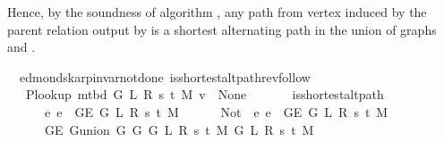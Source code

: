 \begin{isabellebody}
\isamarkupfalse%
%
\endisatagproof
{\isafoldproof}%
%
\isadelimproof
%
\endisadelimproof
%
\begin{isamarkuptext}%
Hence, by the soundness of algorithm , any path from vertex  induced
by the parent relation output by  is a shortest alternating path in the union
of graphs  and .%
\end{isamarkuptext}\isamarkuptrue%
\isamarkupfalse%
\ {\isacharparenleft}{\kern0pt}\ edmonds{\isacharunderscore}{\kern0pt}karp{\isacharunderscore}{\kern0pt}invar{\isacharunderscore}{\kern0pt}not{\isacharunderscore}{\kern0pt}done{\isacharunderscore}{\kern0pt}{}{\isacharparenright}{\kern0pt}\ is{\isacharunderscore}{\kern0pt}shortest{\isacharunderscore}{\kern0pt}alt{\isacharunderscore}{\kern0pt}path{\isacharunderscore}{\kern0pt}rev{\isacharunderscore}{\kern0pt}follow{\isacharcolon}{\kern0pt}\isanewline
\ \ \ {\isachardoublequoteopen}P{\isacharunderscore}{\kern0pt}lookup\ {\isacharparenleft}{\kern0pt}m{\isacharunderscore}{\kern0pt}tbd\ G\ L\ R\ s\ t\ M{\isacharparenright}{\kern0pt}\ v\ {\isasymnoteq}\ None{\isachardoublequoteclose}\isanewline
\ \ \isanewline
\ \ \ \ {\isachardoublequoteopen}is{\isacharunderscore}{\kern0pt}shortest{\isacharunderscore}{\kern0pt}alt{\isacharunderscore}{\kern0pt}path\isanewline
\ \ \ \ \ \ {\isacharparenleft}{\kern0pt}{\isasymlambda}e{\isachardot}{\kern0pt}\ e\ {\isasymin}\ G{\isachardot}{\kern0pt}E\ {\isacharparenleft}{\kern0pt}G{}\ L\ R\ s\ t\ M{\isacharparenright}{\kern0pt}{\isacharparenright}{\kern0pt}\isanewline
\ \ \ \ \ \ {\isacharparenleft}{\kern0pt}Not\ {\isasymcirc}\ {\isacharparenleft}{\kern0pt}{\isasymlambda}e{\isachardot}{\kern0pt}\ e\ {\isasymin}\ G{\isachardot}{\kern0pt}E\ {\isacharparenleft}{\kern0pt}G{}\ L\ R\ s\ t\ M{\isacharparenright}{\kern0pt}{\isacharparenright}{\kern0pt}{\isacharparenright}{\kern0pt}\isanewline
\ \ \ \ \ \ {\isacharparenleft}{\kern0pt}G{\isachardot}{\kern0pt}E\ {\isacharparenleft}{\kern0pt}G{\isachardot}{\kern0pt}union\ {\isacharparenleft}{\kern0pt}G{}\ G\ {\isacharparenleft}{\kern0pt}G{}\ L\ R\ s\ t\ M{\isacharparenright}{\kern0pt}{\isacharparenright}{\kern0pt}\ {\isacharparenleft}{\kern0pt}G{}\ L\ R\ s\ t\ M{\isacharparenright}{\kern0pt}{\isacharparenright}{\kern0pt}{\isacharparenright}{\kern0pt}\isanewline

\end{isabellebody}
